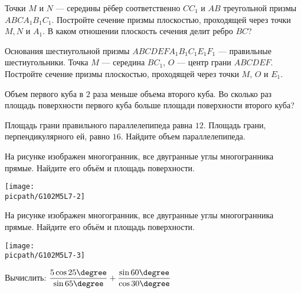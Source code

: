 \begin{class}[number=7]
	\begin{listofex}
		\item Точки \(M\) и \(N\) --- середины рёбер соответственно \(CC_1\) и \(AB\) треугольной призмы \(ABCA_1B_1C_1\). Постройте сечение призмы плоскостью, проходящей через точки \(M, N\) и \(A_1\). В каком отношении плоскость сечения делит ребро \(BC\)?
		\item Основания шестиугольной призмы \( ABCDEFA_1B_1C_1E_1F_1 \) --- правильные шестиугольники. Точка \( M \) --- середина \( BC_1 \), \( O \) --- центр грани \( ABCDEF \). Постройте сечение призмы плоскостью, проходящей через точки \( M \), \( O \) и \( E_1 \).
		\item Объем первого куба в \( 2 \) раза меньше объема второго куба. Во сколько раз площадь поверхности первого куба больше площади поверхности второго куба?
		\item Площадь грани правильного параллелепипеда равна \( 12 \). Площадь грани, перпендикулярного ей, равно \(16\). Найдите объем параллелепипеда.
		\item 
		\begin{minipage}[t]{\bodywidth}
			На рисунке изображен многогранник, все двугранные углы многогранника прямые. Найдите его объём и площадь поверхности.
		\end{minipage}
		\hspace{0.02\linewidth}
		\begin{minipage}[t]{\picwidth}
			\texttt{[image: \\picpath/G102M5L7-2]}
		\end{minipage}
		\item 
		\begin{minipage}[t]{\bodywidth}
			На рисунке изображен многогранник, все двугранные углы многогранника прямые. Найдите его объём и площадь поверхности.
		\end{minipage}
		\hspace{0.02\linewidth}
		\begin{minipage}[t]{\picwidth}
			\texttt{[image: \\picpath/G102M5L7-3]}
		\end{minipage}
		\item Вычислить: \( \dfrac{5\cos 25\degree}{\sin 65\degree}+\dfrac{\sin 60\degree}{\cos 30\degree} \)
	\end{listofex}
\end{class}

